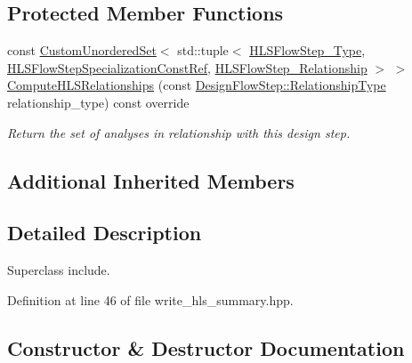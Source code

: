 \subsection*{Protected Member Functions}
\begin{DoxyCompactItemize}
\item 
const \hyperlink{classCustomUnorderedSet}{Custom\+Unordered\+Set}$<$ std\+::tuple$<$ \hyperlink{hls__step_8hpp_ada16bc22905016180e26fc7e39537f8d}{H\+L\+S\+Flow\+Step\+\_\+\+Type}, \hyperlink{hls__step_8hpp_a5fdd2edf290c196531d21d68e13f0e74}{H\+L\+S\+Flow\+Step\+Specialization\+Const\+Ref}, \hyperlink{hls__step_8hpp_a3ad360b9b11e6bf0683d5562a0ceb169}{H\+L\+S\+Flow\+Step\+\_\+\+Relationship} $>$ $>$ \hyperlink{classWriteHLSSummary_ab29ce95624208cd40c9cef9603c349bf}{Compute\+H\+L\+S\+Relationships} (const \hyperlink{classDesignFlowStep_a723a3baf19ff2ceb77bc13e099d0b1b7}{Design\+Flow\+Step\+::\+Relationship\+Type} relationship\+\_\+type) const override
\begin{DoxyCompactList}\small\item\em Return the set of analyses in relationship with this design step. \end{DoxyCompactList}\end{DoxyCompactItemize}
\subsection*{Additional Inherited Members}


\subsection{Detailed Description}
Superclass include. 

Definition at line 46 of file write\+\_\+hls\+\_\+summary.\+hpp.



\subsection{Constructor \& Destructor Documentation}
\mbox{\label{classWriteHLSSummary_a7de3ea8d1f25c14e5fe9248377e4b408}} 
